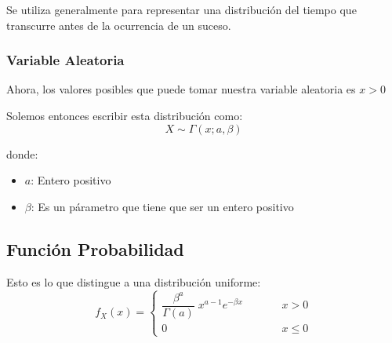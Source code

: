 \documentclass[12pt, fleqn]{report}                             %
\DeclareMathOperator \MegaSpace {\quad \quad}                   %
\theoremstyle{break}                                            %
\begin{document}
                Se utiliza generalmente para representar una distribución del tiempo
                que transcurre antes de la ocurrencia de un suceso.


                \vspace{1em}
                \subsubsection{Variable Aleatoria}

                    Ahora, los valores posibles que puede tomar nuestra variable aleatoria es
                    $x > 0$

                    Solemos entonces escribir esta distribución como:
                    \begin{equation*}
                        X \sim \Gamma(x; a, \beta)
                    \end{equation*}

                    donde:
                    \begin{itemize}
                        \item $a$: Entero positivo
                        \item $\beta$: Es un párametro que tiene que ser un entero positivo
                    \end{itemize}
      
            \clearpage
            \subsection{Función Probabilidad}

                Esto es lo que distingue a una distribución uniforme:
                \begin{equation*}
                    f_X(x) = 
                        \begin{cases}
                            \dfrac{\beta^a}{\Gamma(a)} \; x^{a - 1} e^{-\beta x}    \MegaSpace & x > 0           \\
                            0                                                       \MegaSpace & x \leq 0
                        \end{cases}
                \end{equation*}
\end{document}

